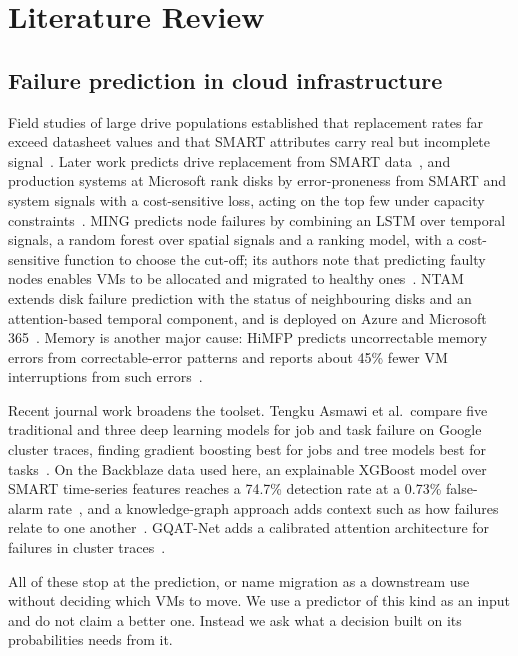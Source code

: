 \documentclass[pdflatex,sn-mathphys-num,iicol]{sn-jnl}
\theoremstyle{thmstyleone}%
\theoremstyle{thmstylethree}%
\begin{document}
\section{Literature Review}\label{sec:related}

\subsection{Failure prediction in cloud infrastructure}\label{sec:rel-pred}

Field studies of large drive populations established that replacement rates far exceed datasheet
values and that SMART attributes carry real but incomplete signal~\cite{schroeder2007disk}. Later
work predicts drive replacement from SMART data~\cite{botezatu2016predicting}, and production
systems at Microsoft rank disks by error-proneness from SMART and system signals with a
cost-sensitive loss, acting on the top few under capacity constraints~\cite{xu2018cdef}. MING
predicts node failures by combining an LSTM over temporal signals, a random forest over spatial
signals and a ranking model, with a cost-sensitive function to choose the cut-off; its authors
note that predicting faulty nodes enables VMs to be allocated and migrated to healthy
ones~\cite{lin2018ming}. NTAM extends disk failure prediction with the status of neighbouring
disks and an attention-based temporal component, and is deployed on Azure and Microsoft
365~\cite{luo2021ntam}. Memory is another major cause: HiMFP predicts uncorrectable memory errors
from correctable-error patterns and reports about 45\% fewer VM interruptions from such
errors~\cite{yu2023himfp}.

Recent journal work broadens the toolset. Tengku Asmawi et al.\ compare five traditional and three
deep learning models for job and task failure on Google cluster traces, finding gradient boosting
best for jobs and tree models best for tasks~\cite{asmawi2022cloud}. On the Backblaze data used
here, an explainable XGBoost model over SMART time-series features reaches a 74.7\% detection rate
at a 0.73\% false-alarm rate~\cite{li2025explainable}, and a knowledge-graph approach adds context
such as how failures relate to one another~\cite{chhetri2022kg}. GQAT-Net adds a calibrated
attention architecture for failures in cluster traces~\cite{tripathi2025gqat}.

All of these stop at the prediction, or name migration as a downstream use without deciding which
VMs to move. We use a predictor of this kind as an input and do not claim a better one. Instead we
ask what a decision built on its probabilities needs from it.
\end{document}
